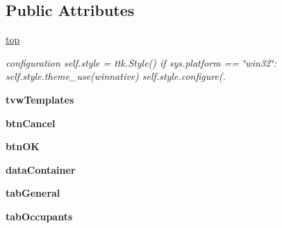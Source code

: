 \subsection*{Public Attributes}
\begin{DoxyCompactItemize}
\item 
\hyperlink{class_f_occupant_templates_1_1_frm_occupant_templates_a8aab264665f2085687d9eeca4c67a691}{top}
\begin{DoxyCompactList}\small\item\em configuration self.\+style = ttk.\+Style() if sys.\+platform == \char`\"{}win32\char`\"{}\+: self.\+style.\+theme\+\_\+use(\textquotesingle{}winnative\textquotesingle{}) self.\+style.\+configure(\textquotesingle{}. \end{DoxyCompactList}\item 
\mbox{\label{class_f_occupant_templates_1_1_frm_occupant_templates_a707f220a2b61183c6209feef648f12da}} 
{\bfseries tvw\+Templates}
\item 
\mbox{\label{class_f_occupant_templates_1_1_frm_occupant_templates_a026309584087467d71c3f4af14102b44}} 
{\bfseries btn\+Cancel}
\item 
\mbox{\label{class_f_occupant_templates_1_1_frm_occupant_templates_ad51735611b2c34fc0d40826fca86792f}} 
{\bfseries btn\+OK}
\item 
\mbox{\label{class_f_occupant_templates_1_1_frm_occupant_templates_a8a52430ec740c576d2ff73adcc56887b}} 
{\bfseries data\+Container}
\item 
\mbox{\label{class_f_occupant_templates_1_1_frm_occupant_templates_ab7f21eb3200b90c22d0814ef7446db99}} 
{\bfseries tab\+General}
\item 
\mbox{\label{class_f_occupant_templates_1_1_frm_occupant_templates_a29330eb364e759b8e3a98d0929258003}} 
{\bfseries tab\+Occupants}
\item 
\mbox{\label{class_f_occupant_templates_1_1_frm_occupant_templates_a570b8f6946403d60d00cfcafd914d6bd}} 

\end{DoxyCompactItemize}
